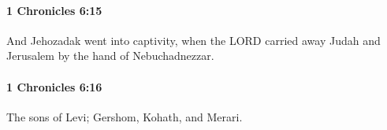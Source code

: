 		\paragraph{1 Chronicles 6:15} %
			\label{1CHRONICLES-6-15}

			And Jehozadak went into captivity, when the LORD carried away Judah and Jerusalem by the hand of Nebuchadnezzar.


		\paragraph{1 Chronicles 6:16} %
			\label{1CHRONICLES-6-16}

			The sons of Levi; Gershom, Kohath, and Merari.


